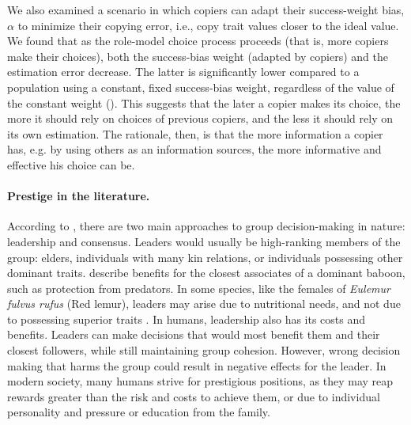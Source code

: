 \documentclass[12pt]{extarticle}
\begin{document}
We also examined a scenario in which copiers can adapt their success-weight bias, $\alpha$ to minimize their copying error, i.e., copy trait values closer to the ideal value.
We found that as the role-model choice process proceeds (that is, more copiers make their choices), both the success-bias weight (adapted by copiers) and the estimation error decrease. 
The latter is significantly lower compared to a population using a constant, fixed success-bias weight, regardless of the value of the constant weight ().
This suggests that the later a copier makes its choice, the more it should rely on choices of previous copiers, and the less it should rely on its own estimation.
The rationale, then, is that the more information a copier has, e.g. by using others as an information sources, the more informative and effective his choice can be.

\paragraph{Prestige in the literature.}

According to \citet{animal_leadership}, there are two main approaches to group decision-making in nature: leadership and consensus.
Leaders would usually be high-ranking members of the group: elders, individuals with many kin relations, or individuals possessing other dominant traits.
\citet{animal_leadership} describe benefits for the closest associates of a dominant baboon, such as protection from predators. 
In some species, like the females of \textit{Eulemur fulvus rufus} (Red lemur), leaders may arise due to nutritional needs, and not due to possessing superior traits \citep{lemurs}. 
In humans, leadership also has its costs and benefits. Leaders can make decisions that would most benefit them and their closest followers, while still maintaining group cohesion. 
However, wrong decision making that harms the group could result in negative effects for the leader. 
In modern society, many humans strive for prestigious positions, as they may reap rewards greater than the risk and costs to achieve them, or due to individual personality and pressure or education from the family. 
\end{document}
